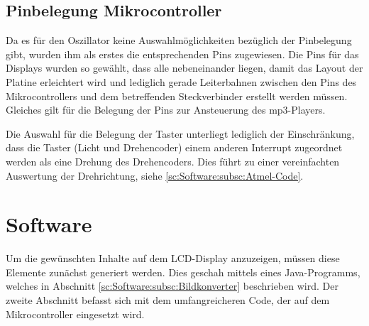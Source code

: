 \documentclass[journal, a4paper]{IEEEtran}
\begin{document}
	\subsection{Pinbelegung Mikrocontroller}
		\label{sc:Hardware:subsc:Pinbelegung}
		Da es für den Oszillator keine Auswahlmöglichkeiten bezüglich der Pinbelegung gibt, wurden ihm als erstes die entsprechenden Pins zugewiesen. Die Pins für das Displays wurden so gewählt, dass alle nebeneinander liegen, damit das Layout der Platine erleichtert wird und lediglich gerade Leiterbahnen zwischen den Pins des Mikrocontrollers und dem betreffenden Steckverbinder erstellt werden müssen. Gleiches gilt für die Belegung der Pins zur Ansteuerung des mp3-Players.\par
		Die Auswahl für die Belegung der Taster unterliegt lediglich der Einschränkung, dass die Taster (Licht und Drehencoder) einem anderen Interrupt zugeordnet werden als eine Drehung des Drehencoders. Dies führt zu einer vereinfachten Auswertung der Drehrichtung, siehe \ref{sc:Software:subsc:Atmel-Code}.
		
		
\section{Software}
	Um die gewünschten Inhalte auf dem LCD-Display anzuzeigen, müssen diese Elemente zunächst generiert werden. Dies geschah mittels eines Java-Programms, welches in Abschnitt \ref{sc:Software:subsc:Bildkonverter} beschrieben wird. Der zweite Abschnitt befasst sich mit dem umfangreicheren Code, der auf dem Mikrocontroller eingesetzt wird.
\end{document}
